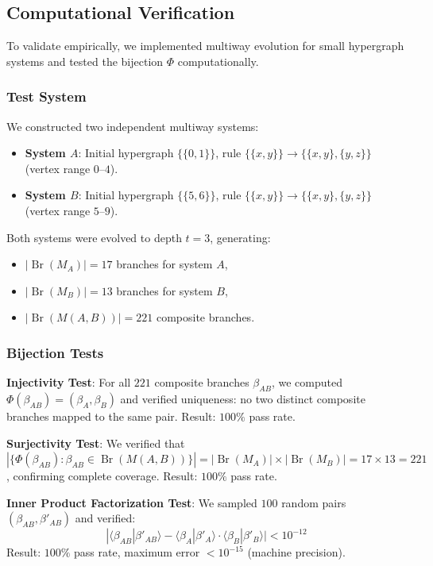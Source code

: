 \documentclass[11pt,a4paper]{article}
\theoremstyle{definition}
\theoremstyle{remark}
\DeclareMathOperator{\Br}{Br}
\newcommand{\braket}[2]{\langle#1|#2\rangle}
\newcommand{\abs}[1]{|#1|}
\begin{document}
\subsection{Computational Verification}

To validate  empirically, we implemented multiway evolution for small hypergraph systems and tested the bijection $\Phi$ computationally.

\subsubsection{Test System}

We constructed two independent multiway systems:
\begin{itemize}
\item \textbf{System $A$}: Initial hypergraph $\{\{0,1\}\}$, rule $\{\{x,y\}\} \to \{\{x,y\}, \{y,z\}\}$ (vertex range $0$--$4$).
\item \textbf{System $B$}: Initial hypergraph $\{\{5,6\}\}$, rule $\{\{x,y\}\} \to \{\{x,y\}, \{y,z\}\}$ (vertex range $5$--$9$).
\end{itemize}

Both systems were evolved to depth $t=3$, generating:
\begin{itemize}
\item $\abs{\Br(M_A)} = 17$ branches for system $A$,
\item $\abs{\Br(M_B)} = 13$ branches for system $B$,
\item $\abs{\Br(M(A,B))} = 221$ composite branches.
\end{itemize}

\subsubsection{Bijection Tests}

\textbf{Injectivity Test}: For all $221$ composite branches $\beta_{AB}$, we computed $\Phi(\beta_{AB}) = (\beta_A, \beta_B)$ and verified uniqueness: no two distinct composite branches mapped to the same pair. Result: $100\%$ pass rate.

\textbf{Surjectivity Test}: We verified that $\abs{\{\Phi(\beta_{AB}) : \beta_{AB} \in \Br(M(A,B))\}} = \abs{\Br(M_A)} \times \abs{\Br(M_B)} = 17 \times 13 = 221$, confirming complete coverage. Result: $100\%$ pass rate.

\textbf{Inner Product Factorization Test}: We sampled $100$ random pairs $(\beta_{AB}, \beta'_{AB})$ and verified:
\begin{equation}
\abs{\braket{\beta_{AB}}{\beta'_{AB}} - \braket{\beta_A}{\beta'_A} \cdot \braket{\beta_B}{\beta'_B}} < 10^{-12}
\end{equation}
Result: $100\%$ pass rate, maximum error $< 10^{-15}$ (machine precision).
\end{document}
